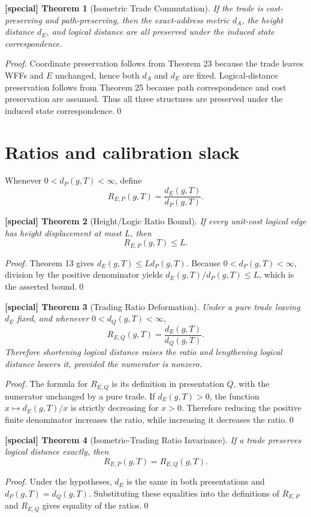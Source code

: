 \documentclass[11pt]{article}
\newtheorem{spthm}{[special] Theorem}
\newcommand{\dA}{d_A}
\newcommand{\dE}{d_E}
\begin{document}
\begin{spthm}[Isometric Trade Commutation]
If the trade is cost-preserving and path-preserving, then the exact-address metric $\dA$, the height distance $\dE$, and logical distance are all preserved under the induced state correspondence.
\end{spthm}
\textit{Proof.} Coordinate preservation follows from Theorem 23 because the trade leaves WFFs and $E$ unchanged, hence both $d_A$ and $d_E$ are fixed. Logical-distance preservation follows from Theorem 25 because path correspondence and cost preservation are assumed. Thus all three structures are preserved under the induced state correspondence.\qed


\section{Ratios and calibration slack}
Whenever $0<d_P(g,T)<\infty$, define
\[
R_{E,P}(g,T)=\frac{\dE(g,T)}{d_P(g,T)}.
\]

\begin{spthm}[Height/Logic Ratio Bound]
If every unit-cost logical edge has height displacement at most $L$, then
\[R_{E,P}(g,T)\le L.\]
\end{spthm}
\textit{Proof.} Theorem 13 gives $d_E(g,T)\le Ld_P(g,T)$. Because $0<d_P(g,T)<\infty$, division by the positive denominator yields $d_E(g,T)/d_P(g,T)\le L$, which is the asserted bound.\qed


\begin{spthm}[Trading Ratio Deformation]
Under a pure trade leaving $\dE$ fixed, and whenever $0<d_Q(g,T)<\infty$,
\[
R_{E,Q}(g,T)=\frac{\dE(g,T)}{d_Q(g,T)}.
\]
Therefore shortening logical distance raises the ratio and lengthening logical distance lowers it, provided the numerator is nonzero.
\end{spthm}
\textit{Proof.} The formula for $R_{E,Q}$ is its definition in presentation $Q$, with the numerator unchanged by a pure trade. If $d_E(g,T)>0$, the function $x\mapsto d_E(g,T)/x$ is strictly decreasing for $x>0$. Therefore reducing the positive finite denominator increases the ratio, while increasing it decreases the ratio.\qed


\begin{spthm}[Isometric-Trading Ratio Invariance]
If a trade preserves logical distance exactly, then
\[R_{E,P}(g,T)=R_{E,Q}(g,T).\]
\end{spthm}
\textit{Proof.} Under the hypotheses, $d_E$ is the same in both presentations and $d_P(g,T)=d_Q(g,T)$. Substituting these equalities into the definitions of $R_{E,P}$ and $R_{E,Q}$ gives equality of the ratios.\qed
\end{document}

